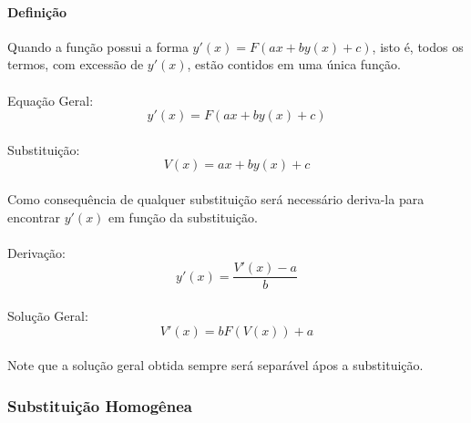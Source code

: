 \documentclass{article}
\begin{document}
                \paragraph{Definição}Quando a função possui a forma $y'(x)=F(ax+by(x)+c)$, isto é, todos os termos, com excessão de $y'(x)$, estão contidos em uma única função.
                \paragraph{}Equação Geral:
                    \begin{equation}
                        y'(x)=F(ax+by(x)+c)
                    \end{equation}
                \paragraph{}Substituição:
                    \begin{equation}
                        V(x)=ax+by(x)+c
                    \end{equation}
                \paragraph{}Como consequência de qualquer substituição será necessário deriva-la para encontrar $y'(x)$ em função da substituição.
                \paragraph{}Derivação:
                    \begin{equation}
                        y'(x)=\frac{V'(x)-a}{b}
                    \end{equation}
                \paragraph{}Solução Geral:
                    \begin{equation}
                        V'(x)=bF(V(x))+a
                    \end{equation}
                \paragraph{}Note que a solução geral obtida sempre será separável ápos a substituição.

            \subsubsection{Substituição Homogênea}
\end{document}
